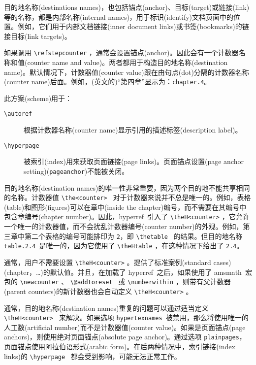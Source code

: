 \documentclass{article}
\newcommand*{\cs}[1]{%
  \texttt{\textbackslash #1}%
}
\newcommand*{\xpackage}[1]{\textsf{#1}}
\begin{document}
目的地名称(destinations names)，也包括锚点(anchor)、目标(target)或链接(link)等的名称，都是内部名称(internal names)，用于标识(identify)文档页面中的位置。例如，它们用于内部文档链接(inner document links)或书签(bookmarks)的链接目标(link targets)。

如果调用 \cs{refstepcounter}，通常会设置锚点(anchor)。因此会有一个计数器名称和值(counter name and value)。两者都用于构造目的地名称(destination name)。默认情况下，计数器值(counter value)跟在由句点(dot)分隔的计数器名称(counter name)后面。例如，(英文的)“第四章”显示为：\verb|chapter.4|。{}

此方案(scheme)用于：
\begin{description}
  \item[\cs{autoref}] 根据计数器名称(counter name)显示引用的描述标签(description label)。
  \item[\cs{hyperpage}] 被索引(index)用来获取页面链接(page links)。页面锚点设置(page anchor setting)(\verb|pageanchor|)不能被关闭。
\end{description}

目的地名称(destination names)的唯一性非常重要，因为两个目的地不能共享相同的名称。计数器值 \cs{the<counter>}\ 对于计数器来说并不总是唯一的。例如，表格(table)和图形(figures)可以在章中(inside the chapter)编号，而不需要在其编号中包含章编号(chapter number)。因此，\xpackage{hyperref}\ 引入了 \cs{theH<counter>}，它允许一个唯一的计数器值，而不会扰乱计数器编号(counter number)的外观。例如，第三章中第二个表格的编号可能排印为 \texttt{2}，即 \cs{thetable}\ 的结果。但目的地名称 \texttt{table.2.4}\ 是唯一的，因为它使用了 \cs{theHtable}，在这种情况下给出了 \verb|2.4|。

通常，用户不需要设置 \cs{theH<counter>}。提供了标准案例(standard cases)(chapter，\dots)的默认值。并且，在加载了 \xpackage{hyperref}\ 之后，如果使用了 \xpackage{amsmath}\ 宏包的 \cs{newcounter}、\cs{@addtoreset}\ 或 \cs{numberwithin}，则带有父计数器(parent counters)的新计数器也会自动定义 \cs{theH<counter>}。

通常，目的地名称(destination names)重复的问题可以通过适当定义 \cs{theH<counter>}\ 来解决。如果选项 \texttt{hypertexnames}\ 被禁用，那么将使用唯一的人工数(artificial number)而不是计数器值(counter value)。如果是页面锚点(page anchors)，则使用绝对页面锚点(absolute page anchor)。通过选项 \texttt{plainpages}，页面锚点使用阿拉伯语形式(arabic form)。在后两种情况中，索引链接(index links)的 \cs{hyperpage}\ 都会受到影响，可能无法正常工作。
\end{document}
